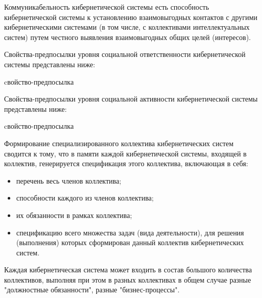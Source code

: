 Коммуникабельность кибернетической системы есть способность кибернетической системы к установлению взаимовыгодных контактов с другими кибернетическими системами (в том числе, с коллективами интеллектуальных систем) путем честного выявления взаимовыгодных общих целей (интересов).

Свойства-предпосылки уровня социальной ответственности кибернетической системы представлены ниже:

\begin{SCn}
\begin{scnrelfromlist}{cвойство-предпосылка}
\end{scnrelfromlist}
\end{SCn}

Свойства-предпосылки уровня социальной активности кибернетической системы представлены ниже:

\begin{SCn}
\begin{scnrelfromlist}{cвойство-предпосылка}
\end{scnrelfromlist}
\end{SCn}

Формирование специализированного коллектива кибернетических систем сводится к тому, что в памяти каждой кибернетической системы, входящей в коллектив, генерируется спецификация этого коллектива, включающая в себя:
\begin{itemize}
    \item{перечень весь членов коллектива;}
    \item{способности каждого из членов коллектива;}
    \item{их обязанности в рамках коллектива;}
    \item{спецификацию всего множества задач (вида деятельности), для решения (выполнения) которых сформирован данный коллектив кибернетических систем.}
\end{itemize}

Каждая кибернетическая система может входить в состав большого количества коллективов, выполняя при этом в разных коллективах в общем случае разные "должностные обязанности"{}, разные "бизнес-процессы"{}.
